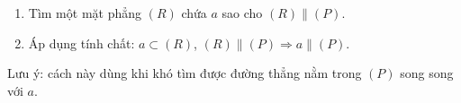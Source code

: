 \begin{enumerate}
\item Tìm một mặt phẳng $(R)$ chứa $a$ sao cho $(R)\parallel(P)$.
\item Áp dụng tính chất: $a\subset(R)$, $(R)\parallel(P)\Rightarrow a\parallel(P)$.
\end{enumerate}
Lưu ý: cách này dùng khi khó tìm được đường thẳng nằm trong $(P)$ song song với $a$.
